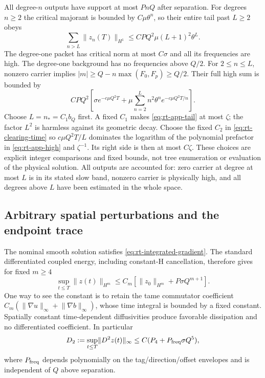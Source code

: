 \documentclass[11pt,a4paper]{amsart}
\theoremstyle{definition}
\theoremstyle{remark}
\numberwithin{equation}{section}
\newcommand{\norm}[1]{\lVert #1\rVert}
\begin{document}
All degree-$n$ outputs have support at most $PnQ$ after separation.
For degrees $n\ge2$ the critical majorant is bounded by $C\mu\theta^n$,
so their entire tail past $L\ge2$ obeys
\begin{equation}\label{eq:rt-app-tail}
 \sum_{n>L}\norm{z_n(T)}_{H^1}
       \le CPQ^2\mu(L+1)^2\theta^L.
\end{equation}
The degree-one packet has critical norm at most $C\sigma$ and all its
frequencies are high.  The degree-one background has no frequencies
above $Q/2$.  For $2\le n\le L$, nonzero carrier implies
$|m|\ge Q-n\max(F_0,F_p)\ge Q/2$.  Their full high sum is bounded by
\begin{equation}\label{eq:rt-app-high}
 CPQ^2\left[\sigma e^{-c\mu Q^2T}
       +\mu\sum_{n=2}^L n^2\theta^n
                             e^{-c\mu Q^2T/n}\right].
\end{equation}
Choose $L=n_*=C_1b_Q$ first.  A fixed $C_1$ makes
\eqref{eq:rt-app-tail} at most $\zeta$; the factor $L^2$ is harmless
against its geometric decay.  Choose the fixed $C_2$ in
\eqref{eq:rt-clearing-time} so
$c\mu Q^2T/L$ dominates the logarithm of the polynomial prefactor in
\eqref{eq:rt-app-high} and $\zeta^{-1}$.  Its right side is then at
most $C\zeta$.  These choices are explicit integer comparisons and
fixed bounds, not tree enumeration or evaluation of the physical solution.
All outputs are accounted for: zero carrier at degree at most $L$ is
in its stated slow band, nonzero carrier is physically high, and all
degrees above $L$ have been estimated in the whole space.

\subsection{Arbitrary spatial perturbations and the endpoint trace}
The nominal smooth solution satisfies \eqref{eq:rt-integrated-gradient}.
The standard differentiated coupled energy, including constant-H
cancellation, therefore gives for fixed $m\ge4$
\begin{equation}\label{eq:rt-app-smooth}
 \sup_{t\le T}\norm{z(t)}_{H^m}
 \le C_m[\norm{z_0}_{H^m}+P\sigma Q^{m+1}].
\end{equation}
One way to see the constant is to retain the tame commutator coefficient
$C_m(\norm{\nabla u}_\infty+\norm{\nabla b}_\infty)$, whose time integral
is bounded by a fixed constant.  Spatially constant time-dependent
diffusivities produce favorable dissipation and no differentiated
coefficient.  In particular
\[
 D_2:=\sup_{t\le T}\norm{D^2z(t)}_\infty
       \le C(P_4+P_{\rm freq}\sigma Q^5),
\]
where $P_{\rm freq}$ depends polynomially on the tag/direction/offset
envelopes and is independent of $Q$ above separation.
\end{document}
